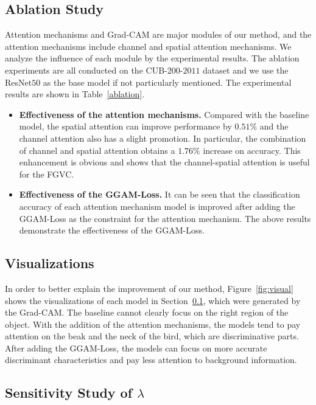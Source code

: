 \documentclass{article}
\begin{document}
\subsection{Ablation Study}\label{ssec:ablation}

Attention mechanisms and Grad-CAM are major modules of our method, and the attention mechanisms include channel and spatial attention mechanisms. We analyze the influence of each module by the experimental results. The ablation experiments are all conducted on the CUB-$200$-$2011$ dataset and we use the ResNet$50$
as the base model if not particularly mentioned. The experimental results are shown in Table~\ref{ablation}.
\vspace{-1mm}
\begin{itemize}
    \item \textbf{Effectiveness of the attention mechanisms.} Compared with the baseline model, the spatial attention can improve performance by $0.51\%$ and the channel attention also has a slight promotion. In particular, the combination of channel and spatial attention obtains a $1.76\%$ increase on accuracy. This enhancement is obvious and shows that the channel-spatial attention is useful for the FGVC.
  
    \item \textbf{Effectiveness of the GGAM-Loss.} It can be seen that the classification accuracy of  each attention mechanism model is improved after adding the GGAM-Loss as the constraint for the attention mechanism. The above results demonstrate the effectiveness of the GGAM-Loss.
\end{itemize}

\subsection{Visualizations}


In order to better explain the improvement of our method, Figure~\ref{fig:visual} shows the visualizations of each model in Section~\ref{ssec:ablation}, which were generated by the Grad-CAM. The baseline cannot clearly focus on the right region of the object. With the addition of the attention mechanisms, the models tend to pay attention on the beak and the neck of the bird, which are discriminative parts. After adding the GGAM-Loss, the models can focus on more accurate discriminant characteristics and pay less attention to background information.

\subsection{Sensitivity Study of ${\lambda}$}
\end{document}
